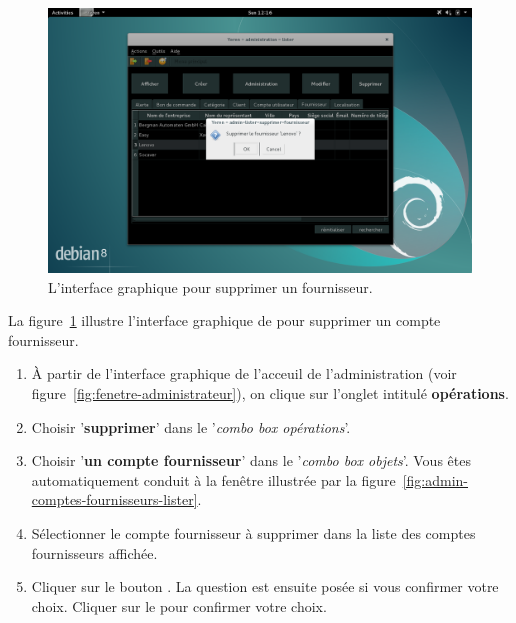 
\newpage
{}

\begin{figure}[!htpb]
	\centering
	\includegraphics[scale=0.39]{images/compte-fournisseur-supprimer.png}
	\caption{L'interface graphique pour supprimer un fournisseur.}
	\label{fig:admin-comptes-fournisseurs-supprimer}
\end{figure}

La figure~\ref{fig:admin-comptes-fournisseurs-supprimer}
illustre l'interface graphique de \yeren pour supprimer
un compte fournisseur.

\begin{enumerate}[1)]
	\item \`A partir de l'interface graphique de l'acceuil de
		l'administration (voir figure~\ref{fig:fenetre-administrateur}),
		on clique sur l'onglet intitul\'e \textbf{op\'erations}. 
		
	\item Choisir '\textbf{supprimer}' dans le '\emph{combo box
		op\'erations}'.
		
	\item Choisir '\textbf{un compte fournisseur}' dans le
		'\emph{combo box objets}'. Vous \^etes automatiquement
		conduit \`a la fen\^etre illustr\'ee par la
		figure~\ref{fig:admin-comptes-fournisseurs-lister}.
		
	\item S\'electionner le compte fournisseur \`a supprimer
		dans la liste des comptes fournisseurs affich\'ee.
		
	\item Cliquer sur le bouton . La question
		est ensuite pos\'ee si vous confirmer votre choix.
		Cliquer sur le  pour confirmer votre choix.
\end{enumerate}

